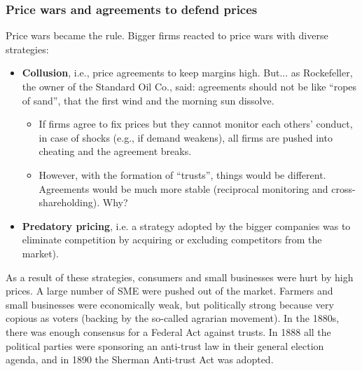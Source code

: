             

        \subsubsection{Price wars and agreements to defend prices}
            Price wars became the rule. Bigger firms reacted to price wars with diverse strategies: 
            \begin{itemize}
                \item \textbf{Collusion}, i.e., price agreements to keep margins high. But... as Rockefeller, the owner of the Standard Oil Co., said: agreements should not be like “ropes of sand”, that the first wind and the morning sun dissolve.  
                \begin{itemize}
                    \item If firms agree to fix prices but they cannot monitor each others’ conduct, in case of shocks (e.g., if demand weakens), all firms are pushed into cheating and the agreement breaks.
                    \item However, with the formation of “trusts”, things would be different. Agreements would be much more stable (reciprocal monitoring and cross-shareholding). Why?
                \end{itemize}
                \item \textbf{Predatory pricing}, i.e. a strategy adopted by the bigger companies was to eliminate competition by acquiring or excluding competitors from the market). 
            \end{itemize}


            As a result of these strategies, consumers and small businesses were hurt by high prices. 
            A large number of SME were pushed out of the market. Farmers and small businesses were economically weak, but politically strong because very copious as voters (backing by the so-called agrarian movement). 
            In the 1880s, there was enough consensus for a Federal Act against trusts. In 1888 all the political parties were sponsoring an anti-trust law in their general election agenda, and in 1890 the Sherman Anti-trust Act was adopted.

